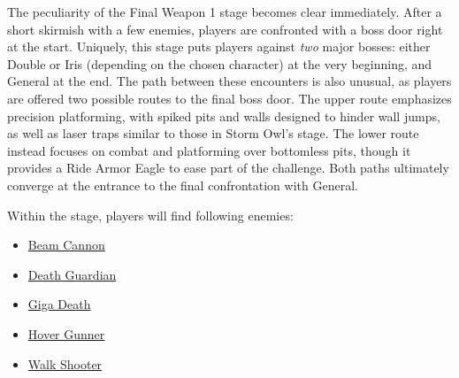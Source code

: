 The peculiarity of the Final Weapon 1 stage becomes clear immediately. After a short skirmish with a few enemies, players are confronted with a boss door right at the start. Uniquely, this stage puts players against \emph{two} major bosses: either Double or Iris (depending on the chosen character) at the very beginning, and General at the end.
The path between these encounters is also unusual, as players are offered two possible routes to the final boss door. The upper route emphasizes precision platforming, with spiked pits and walls designed to hinder wall jumps, as well as laser traps similar to those in Storm Owl’s stage. The lower route instead focuses on combat and platforming over bottomless pits, though it provides a Ride Armor Eagle to ease part of the challenge. Both paths ultimately converge at the entrance to the final confrontation with General.


Within the stage, players will find following enemies:
\begin{itemize}	
	\item \hyperlink {enem:Beam_Cannon}{Beam Cannon}
	\item \hyperlink {enem:Death_Guardian}{Death Guardian}
	\item \hyperlink {enem:Giga_Death}{Giga Death}
	\item \hyperlink {enem:Hover_Gunner}{Hover Gunner}
	\item \hyperlink {enem:Walk_Shooter}{Walk Shooter}
\end{itemize}

